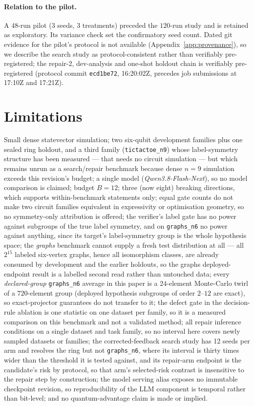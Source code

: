 \documentclass[11pt]{article}
\newcommand{\MODEL}{\textit{Qwen3.8-Flash-Next}}
\begin{document}
\paragraph{Relation to the pilot.} A $48$-run pilot (3 seeds, 3 treatments) preceded the
$120$-run study and is retained as exploratory. Its variance check set the confirmatory
seed count. Dated git evidence for the pilot's protocol is not available
(Appendix~\ref{app:provenance}), so we describe the search study as protocol-consistent
rather than verifiably pre-registered; the repair-2, dev-analysis and one-shot holdout
chain is verifiably pre-registered (protocol commit \texttt{ecd1be72}, 16:20:02Z, precedes
job submissions at 17:10Z and 17:21Z).

\section{Limitations}
\label{sec:limitations}

Small dense statevector simulation; two six-qubit development families plus one sealed
ring holdout, and a third family (\texttt{tictactoe\_n9}) whose label-symmetry structure has
been measured --- that needs no circuit simulation --- but which remains unrun as a
search/repair benchmark because dense $n{=}9$ simulation exceeds this revision's budget; a single model
(\MODEL{}), so no model comparison is claimed; budget $B{=}12$; three (now eight) breaking
directions, which supports within-benchmark statements only; equal gate counts do not make
two circuit families equivalent in expressivity or optimisation geometry, so no
symmetry-only attribution is offered; the verifier's label gate has no power against
subgroups of the true label symmetry, and on \texttt{graphs\_n6} no power against anything,
since its target's label-symmetry group is the whole hypothesis space;
the \emph{graphs} benchmark cannot supply a fresh test distribution at all --- all $2^{15}$
labeled six-vertex graphs, hence all isomorphism classes, are already consumed by
development and the earlier holdouts, so the graphs deployed-endpoint result is a labelled
second read rather than untouched data;
every \emph{declared-group} \texttt{graphs\_n6} average in this paper is a $24$-element
Monte-Carlo twirl of a $720$-element group (deployed hypothesis subgroups of order
$2$--$12$ are exact), so exact-projector guarantees do not transfer to it; the defect gate in
the decision-rule ablation is one statistic on one dataset per family, so it is a measured
comparison on this benchmark and not a validated method;
all repair inference conditions on a single dataset and task family, so no interval here
covers newly sampled datasets or families; the corrected-feedback search study has 12 seeds per
arm and resolves the ring but not \texttt{graphs\_n6}, where its interval is thirty times wider
than the threshold it is tested against, and its repair-arm endpoint is the candidate's risk by
protocol, so that arm's selected-risk contrast is insensitive to the repair step by construction;
the model serving alias exposes no immutable
checkpoint revision, so reproducibility of the LLM component is temporal rather than
bit-level; and no quantum-advantage claim is made or implied.
\end{document}

